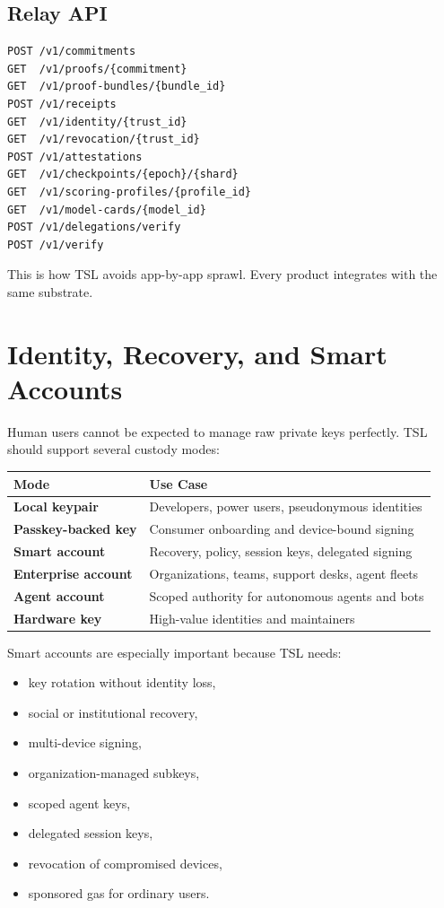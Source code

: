 \documentclass[11pt]{article}
\newcommand{\TSL}{\textsc{TSL}}
\begin{document}
\subsection{Relay API}

\begin{lstlisting}[style=tslcode]
POST /v1/commitments
GET  /v1/proofs/{commitment}
GET  /v1/proof-bundles/{bundle_id}
POST /v1/receipts
GET  /v1/identity/{trust_id}
GET  /v1/revocation/{trust_id}
POST /v1/attestations
GET  /v1/checkpoints/{epoch}/{shard}
GET  /v1/scoring-profiles/{profile_id}
GET  /v1/model-cards/{model_id}
POST /v1/delegations/verify
POST /v1/verify
\end{lstlisting}

This is how \TSL{} avoids app-by-app sprawl. Every product integrates with the same substrate.

\section{Identity, Recovery, and Smart Accounts}

Human users cannot be expected to manage raw private keys perfectly. \TSL{} should support several custody modes:

\begin{center}
\begin{tabularx}{\textwidth}{>{\bfseries}p{} X}
\toprule
Mode & Use Case \\
\midrule
Local keypair & Developers, power users, pseudonymous identities \\
Passkey-backed key & Consumer onboarding and device-bound signing \\
Smart account & Recovery, policy, session keys, delegated signing \\
Enterprise account & Organizations, teams, support desks, agent fleets \\
Agent account & Scoped authority for autonomous agents and bots \\
Hardware key & High-value identities and maintainers \\
\bottomrule
\end{tabularx}
\end{center}

Smart accounts are especially important because \TSL{} needs:

\begin{itemize}
    \item key rotation without identity loss,
    \item social or institutional recovery,
    \item multi-device signing,
    \item organization-managed subkeys,
    \item scoped agent keys,
    \item delegated session keys,
    \item revocation of compromised devices,
    \item sponsored gas for ordinary users.
\end{itemize}
\end{document}
